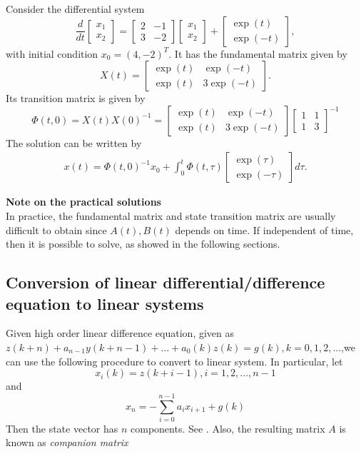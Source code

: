 \begin{refsection}
\begin{example}
	Consider the differential system
	$$\frac{d}{dt}\begin{bmatrix}
	x_1\\
	x_2
	\end{bmatrix} = \begin{bmatrix}
	2 & -1\\
	3 & -2
	\end{bmatrix}\begin{bmatrix}
	x_1\\
	x_2
	\end{bmatrix} + \begin{bmatrix}
	\exp(t)\\
	\exp(-t)
	\end{bmatrix},$$
	with initial condition $x_0 = (4,-2)^T.$
	It has the fundamental matrix given by
	$$X(t) = \begin{bmatrix}
	\exp(t) & \exp(-t) \\
	\exp(t) & 3\exp(-t) 
	\end{bmatrix}.$$
	Its transition matrix is given by
	$$\Phi(t,0)=X(t)X(0)^{-1} =\begin{bmatrix}
	\exp(t) & \exp(-t) \\
	\exp(t) & 3\exp(-t) 
	\end{bmatrix}\begin{bmatrix}
	1 & 1 \\
	1 & 3 
	\end{bmatrix}^{-1}$$
	The
	solution can be written by
	\begin{align*}
	x(t) = \Phi(t,0)^{-1}x_0 + \int_0^t \Phi(t,\tau)\begin{bmatrix}
	\exp(\tau)\\
	\exp(-\tau)
	\end{bmatrix}d\tau. 
	\end{align*}
\end{example}

\begin{remark}
\textbf{Note on the practical solutions}\\
In practice, the fundamental matrix and state transition matrix are usually difficult to obtain since $A(t),B(t)$ depends on time. If independent of time, then it is possible to solve, as showed in the following sections. 
\end{remark}


\subsection{Conversion of linear differential/difference equation to linear systems}
\begin{note}
Given high order linear difference equation, given as
$z(k+n)+a_{n-1}y(k+n-1)+...+ a_0(k)z(k)=g(k),k=0,1,2,...$,we can use the following procedure to convert to linear system. In particular, let
$$x_i(k) = z(k+i-1), i=1,2,...,n-1$$ and $$x_n = -\sum_{i=0}^{n-1}a_i x_{i+1} + g(k)$$
Then the state vector has $n$ components. 
See \cite[96]{luenberger1979introduction}.
Also, the resulting matrix $A$ is known as \emph{companion matrix}


\end{note}
\end{refsection}
